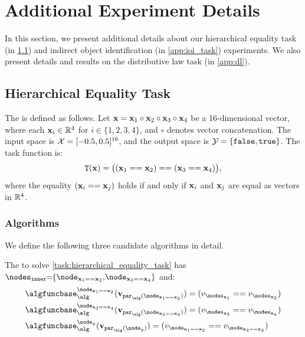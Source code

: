 \section{Additional Experiment Details}\label{app:exp_details}

In this section, we present additional details about our hierarchical equality task (in \cref{subsubsec:hierarchical_equality_details}) and indirect object identification (in \cref{app:ioi_task}) experiments.
We also present details and results on the distributive law task (in \cref{app:dl}).

\subsection{Hierarchical Equality Task}\label{subsubsec:hierarchical_equality_details}

\begin{task}
\label{task:hierarchical_equality_task}
    The  is defined as follows.
    Let $\mathbf{x} = \mathbf{x}_1 \circ \mathbf{x}_2 \circ \mathbf{x}_3 \circ \mathbf{x}_4$ be a 16-dimensional vector, where each $\mathbf{x}_i \in \mathbb{R}^4$ for $i \in \{1,2,3,4\}$, and $\circ$ denotes vector concatenation. The input space is $\mathcal{X} = [-0.5, 0.5]^{16}$, and the output space is $\mathcal{Y} = \{\mathtt{false}, \mathtt{true}\}$. The task function is:
    \begin{align}
        \mathtt{T}(\mathbf{x}) = \big((\mathbf{x}_1 == \mathbf{x}_2) == (\mathbf{x}_3 == \mathbf{x}_4)\big),
    \end{align}
    where the equality $(\mathbf{x}_i == \mathbf{x}_j)$ holds if and only if $\mathbf{x}_i$ and $\mathbf{x}_j$ are equal as vectors in $\mathbb{R}^4$.
\end{task}

\subsubsection{Algorithms}\label{app:heq_algorithms}
We define the following three candidate algorithms in detail.

\begin{causalgraph}\label{alg:both_equality_relations}
    The \! to solve \cref{task:hierarchical_equality_task} has $\nodesinner\!\!=\!\!\{\node_{\bx_1\isequalsubscript\bx_2}, \!\node_{\bx_3\isequalsubscript\bx_4}\}$
    and:
    \begin{align}
        &\algfuncnode{\node_{\bx_1\isequalsubscript\bx_2}}(\nodesvalues_{\parents(\node_{\bx_1\isequalsubscript\bx_2})}) = 
        (\nodevalue_{\nodes_{\bx_1}} \isequal \nodevalue_{\nodes_{\bx_2}}) \nonumber \\
       &\algfuncnode{\node_{\bx_3\isequalsubscript\bx_4}}(\nodesvalues_{\parents(\node_{\bx_3\isequalsubscript\bx_4})}) = 
        (\nodevalue_{\nodes_{\bx_3}} \isequal \nodevalue_{\nodes_{\bx_4}}) \nonumber\\
        &\algfuncnode{\node_{y}}(\nodesvalues_{\parents(\node_{y})}) =
        (\nodevalue_{\node_{\bx_1\isequalsubscript\bx_2}} \isequal \nodevalue_{\node_{\bx_3\isequalsubscript\bx_4}})\nonumber
    \end{align}
\end{causalgraph}

